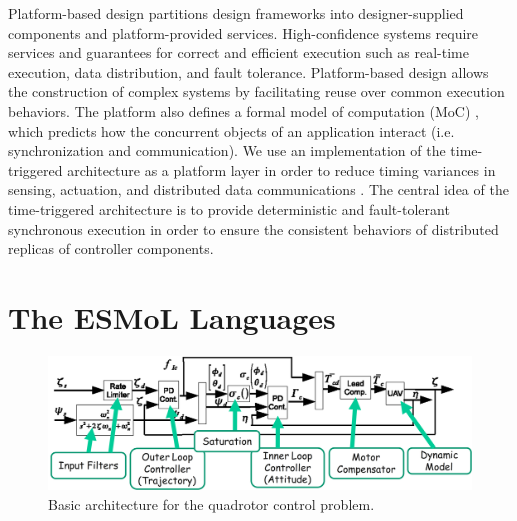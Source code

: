 Platform-based design partitions design frameworks into designer-supplied
components and platform-provided services\cite{modeling:platform}.  
High-confidence systems require services and guarantees 
for correct and efficient execution such as real-time execution, 
data distribution, and fault tolerance.
Platform-based design allows the construction
of complex systems by facilitating reuse over common execution
behaviors. 
The platform also defines a formal model of computation 
(MoC) \cite{sem:taggedsig}, which predicts how the concurrent 
objects of an application interact (i.e. synchronization and 
communication). 
We use an implementation of the time-triggered 
architecture as a platform layer in order to
reduce timing variances in sensing, actuation, and 
distributed data communications \cite{timed:tta}\cite{timed:frodo}.
The central idea of the time-triggered 
architecture is to provide deterministic and fault-tolerant synchronous
execution in order to ensure the consistent behaviors of
distributed replicas of controller components.

\section{The ESMoL Languages}

\begin{figure}
\centering
\includegraphics[width=0.8\columnwidth]{figures/quadrotor_arch.png}
    \caption{Basic architecture for the quadrotor control problem.}
    \label{fig:quadrotor}
\end{figure}


